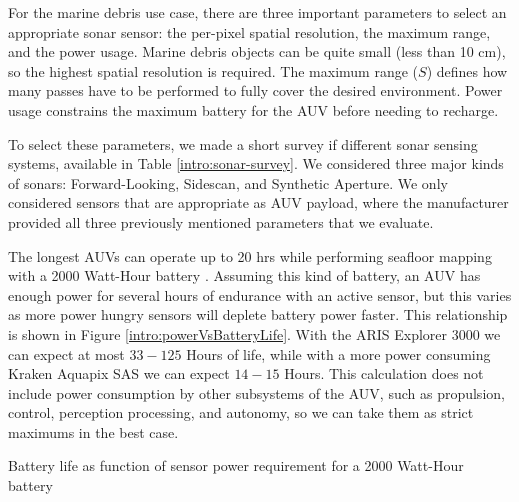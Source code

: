 For the marine debris use case, there are three important parameters to select an appropriate sonar sensor: the per-pixel spatial resolution, the maximum range, and the power usage. Marine debris objects can be quite small (less than 10 cm), so the highest spatial resolution is required. The maximum range ($S$) defines how many passes have to be performed to fully cover the desired environment. Power usage constrains the maximum battery for the AUV before needing to recharge.

To select these parameters, we made a short survey if different sonar sensing systems, available in Table \ref{intro:sonar-survey}. We considered three major kinds of sonars: Forward-Looking, Sidescan, and Synthetic Aperture. We only considered sensors that are appropriate as AUV payload, where the manufacturer provided all three previously mentioned parameters that we evaluate.

The longest AUVs can operate up to 20 hrs while performing seafloor mapping with a 2000 Watt-Hour battery \cite{kirkwood2007development}. Assuming this kind of battery, an AUV has enough power for several hours of endurance with an active sensor, but this varies as more power hungry sensors will deplete battery power faster. This relationship is shown in Figure \ref{intro:powerVsBatteryLife}. With the ARIS Explorer 3000 we can expect at most $33-125$ Hours of life, while with a more power consuming Kraken Aquapix SAS we can expect $14-15$ Hours. This calculation does not include power consumption by other subsystems of the AUV, such as propulsion, control, perception processing, and autonomy, so we can take them as strict maximums in the best case.

\begin{marginfigure}
    \centering
    \caption[Battery life as function of sensor power requirement]{Battery life as function of sensor power requirement for a 2000 Watt-Hour battery}
    \label{intro:powerVsBatteryLife}
\end{marginfigure}

